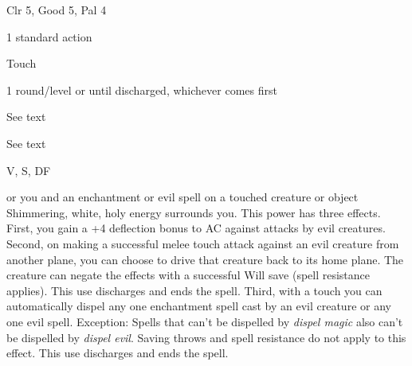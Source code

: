 
\begin{description*}
\item[Level:] Clr 5, Good 5, Pal 4
\item[Casting Time:] 1 standard action
\item[Range:] Touch
\item[Duration:] 1 round/level or until discharged, whichever comes first
\item[Saving Throw:] See text
\item[Spell Resistance:] See text
\item[Components:] V, S, DF
\end{description*}

or you and an enchantment or evil spell on a touched creature or object
Shimmering, white, holy energy surrounds you. This power has three effects.
First, you gain a +4 deflection bonus to AC against attacks by evil creatures.
Second, on making a successful melee touch attack against an evil creature from
another plane, you can choose to drive that creature back to its home plane. The
creature can negate the effects with a successful Will save (spell resistance applies).
This use discharges and ends the spell.
Third, with a touch you can automatically dispel any one enchantment spell cast
by an evil creature or any one evil spell. Exception: Spells that can't
be dispelled by \textit{dispel magic} also can't be dispelled by \textit{dispel
evil}. Saving throws and spell resistance do not apply to this effect. This use
discharges and ends the spell.